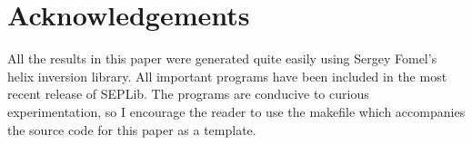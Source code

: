 \section{Acknowledgements}

	All the results in this paper were generated quite easily using 
	Sergey Fomel's helix inversion library.  All important programs
	have been included in the most recent release of SEPLib.  The 
	programs are conducive to curious experimentation, so I encourage
	the reader to use the makefile which accompanies the source
	code for this paper as a template.	



	
